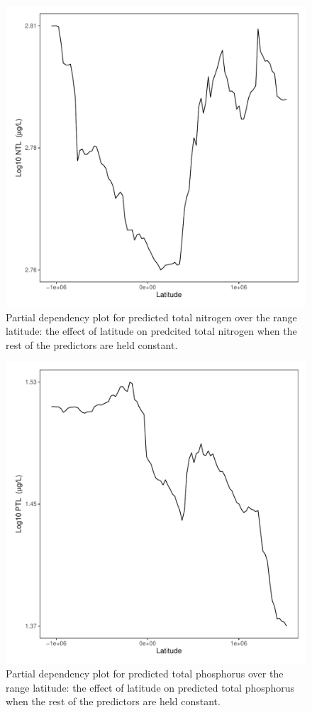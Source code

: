 \documentclass[fleqn,10pt]{wlpeerj} %
\begin{document}
\begin{figure}
  \includegraphics[scale=0.5]{PD_gisvs_N_Latitude.pdf}
  \caption{Partial dependency plot for predicted total nitrogen over the range latitude: the effect of latitude on predcited total nitrogen when the rest of the predictors are held constant.}
  \label{fig:PD_gisvs_N_Latitude}
\end{figure}

\begin{figure}
  \includegraphics[scale=0.5]{PD_gisvs_P_Latitude.pdf}
  \caption{Partial dependency plot for predicted total phosphorus over the range latitude: the effect of latitude on predicted total phosphorus when the rest of the predictors are held constant.}
  \label{fig:PD_gisvs_P_Latitude}
\end{figure}
\end{document}
